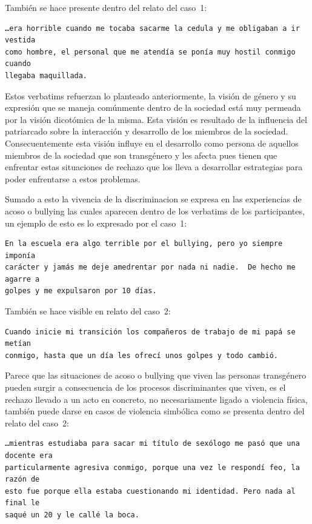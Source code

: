 También se hace presente dentro del relato del caso~1:

\begin{verbatim}
…era horrible cuando me tocaba sacarme la cedula y me obligaban a ir vestida
como hombre, el personal que me atendía se ponía muy hostil conmigo cuando
llegaba maquillada.
\end{verbatim}

Estos verbatims refuerzan lo planteado anteriormente, la visión de género y su
expresión que se maneja comúnmente dentro de la sociedad está muy permeada por
la visión dicotómica de la misma. Esta visión es resultado de la influencia
del patriarcado sobre la interacción y desarrollo de los miembros de la
sociedad. Consecuentemente esta visión influye en el desarrollo como persona de
aquellos miembros de la sociedad que son transgénero y les afecta pues tienen
que enfrentar estas situaciones de rechazo que los lleva a desarrollar
estrategias para poder enfrentarse a estos problemas.

Sumado a esto la vivencia de la discriminacion se expresa en las experiencias de
acoso o bullying las cuales aparecen dentro de los verbatims de los
participantes, un ejemplo de esto es lo expresado por el caso~1:

\begin{verbatim}
En la escuela era algo terrible por el bullying, pero yo siempre imponía
carácter y jamás me deje amedrentar por nada ni nadie.  De hecho me agarre a
golpes y me expulsaron por 10 días.
\end{verbatim}

También se hace visible en relato del caso~2:

\begin{verbatim}
Cuando inicie mi transición los compañeros de trabajo de mi papá se metían
conmigo, hasta que un día les ofrecí unos golpes y todo cambió.
\end{verbatim}

Parece que las situaciones de acoso o bullying que viven las personas
transgénero pueden surgir a consecuencia de los procesos discriminantes que
viven, es el rechazo llevado a un acto en concreto, no necesariamente ligado a
violencia física, también puede darse en casos de violencia simbólica como se
presenta dentro del relato del caso~2:

\begin{verbatim}
…mientras estudiaba para sacar mi título de sexólogo me pasó que una docente era
particularmente agresiva conmigo, porque una vez le respondí feo, la razón de
esto fue porque ella estaba cuestionando mi identidad. Pero nada al final le
saqué un 20 y le callé la boca.
\end{verbatim}

